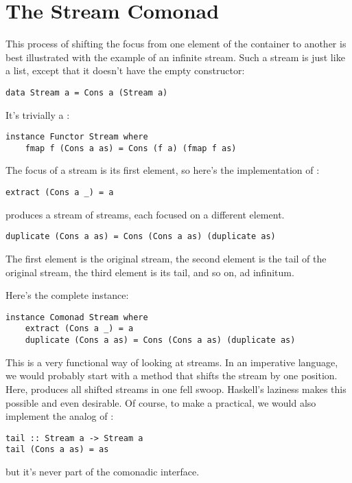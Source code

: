 \section{The Stream Comonad}\label{the-stream-comonad}

This process of shifting the focus from one element of the container to
another is best illustrated with the example of an infinite stream. Such
a stream is just like a list, except that it doesn't have the empty
constructor:

\begin{verbatim}
data Stream a = Cons a (Stream a)
\end{verbatim}
It's trivially a :

\begin{verbatim}
instance Functor Stream where
    fmap f (Cons a as) = Cons (f a) (fmap f as)
\end{verbatim}
The focus of a stream is its first element, so here's the implementation
of :

\begin{verbatim}
extract (Cons a _) = a
\end{verbatim}
 produces a stream of streams, each focused on a
different element.

\begin{verbatim}
duplicate (Cons a as) = Cons (Cons a as) (duplicate as)
\end{verbatim}
The first element is the original stream, the second element is the tail
of the original stream, the third element is its tail, and so on, ad
infinitum.

Here's the complete instance:

\begin{verbatim}
instance Comonad Stream where
    extract (Cons a _) = a 
    duplicate (Cons a as) = Cons (Cons a as) (duplicate as)
\end{verbatim}
This is a very functional way of looking at streams. In an imperative
language, we would probably start with a method  that
shifts the stream by one position. Here,  produces all
shifted streams in one fell swoop. Haskell's laziness makes this
possible and even desirable. Of course, to make a 
practical, we would also implement the analog of :

\begin{verbatim}
tail :: Stream a -> Stream a
tail (Cons a as) = as
\end{verbatim}
but it's never part of the comonadic interface.

